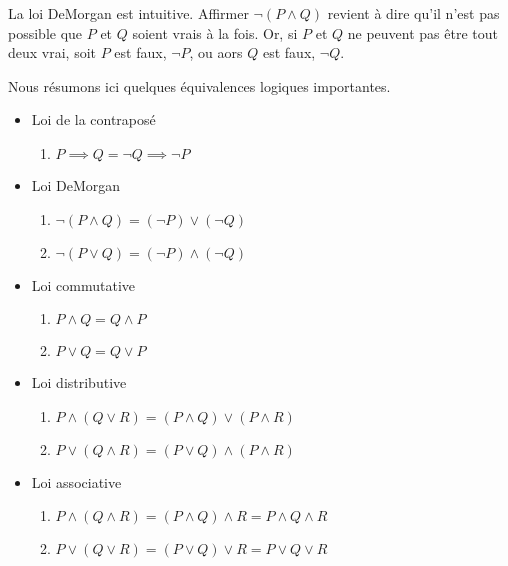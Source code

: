 \documentclass[16pt]{report}
\begin{document}
\begin{multicols*}{2}
                    La loi DeMorgan est intuitive. Affirmer $\neg (P \land Q)$ revient à dire qu'il n'est pas 
                    possible que $P$ et $Q$ soient vrais à la fois. Or, si $P$ et $Q$ ne peuvent pas être 
                    tout deux vrai, soit $P$ est faux, $ \neg P$, ou aors $Q$ est faux, $\neg Q$.


            Nous résumons ici quelques équivalences logiques importantes. 
            \begin{itemize}
                \item Loi de la contraposé 
                    \begin{enumerate}
                        \item $P \implies Q = \neg Q \implies \neg P$ 
                    \end{enumerate}
                \item Loi DeMorgan
                    \begin{enumerate}
                        \item $\neg (P \land Q) = (\neg P) \lor (\neg Q)$ 
                        \item $\neg (P \lor Q) = (\neg P) \land (\neg Q)$
                    \end{enumerate}
                \item Loi commutative
                    \begin{enumerate}
                        \item $P \land Q = Q \land P$ 
                        \item $P \lor Q = Q \lor P$ 
                    \end{enumerate}
                \item Loi distributive
                    \begin{enumerate}
                        \item $ P \land (Q \lor R) = (P \land Q) \lor (P \land R) $
                        \item $ P \lor (Q \land R) = (P \lor Q) \land (P \land R)$ 
                    \end{enumerate}    
                \item Loi associative
                    \begin{enumerate}
                    \item $P \land (Q \land R) = (P \land Q) \land R = P \land Q \land R$ 
                    \item $P \lor (Q \lor R) = (P \lor Q) \lor R = P \lor Q \lor R$
                    \end{enumerate}
            \end{itemize}



\end{multicols*}
\end{document}
